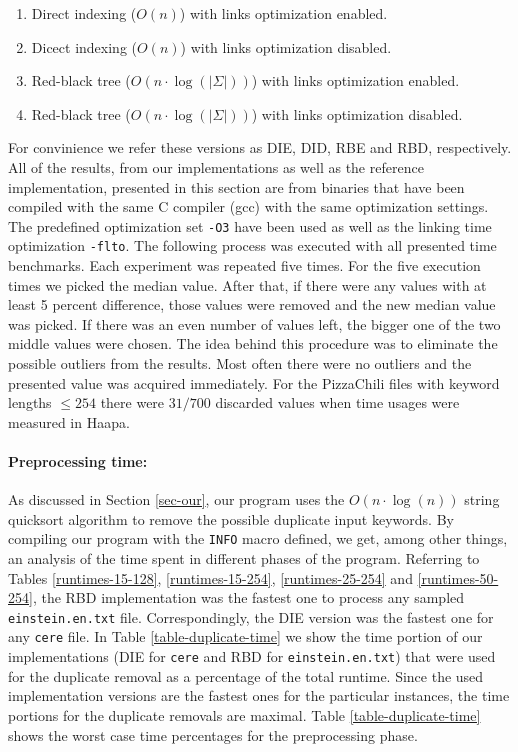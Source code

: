 \documentclass[english,twoside,censored,csm,algorithms-track-2020]{HYthesisML}
\theoremstyle{plain}
\theoremstyle{definition}
\numberwithin{testexample}{chapter}
\begin{document}


\begin{enumerate}
\item Direct indexing ($O(n)$) with links optimization enabled.
\item Dicect indexing ($O(n)$) with links optimization disabled.
\item Red-black tree ($O(n\cdot\log(|\Sigma|))$) with links optimization enabled.
\item Red-black tree ($O(n\cdot\log(|\Sigma|))$) with links optimization disabled.
\end{enumerate}

For convinience we refer these versions as DIE, DID, RBE and RBD, respectively. All of the results,
from our implementations as well as the reference implementation,
presented in this section are from binaries that have been compiled with the same C
compiler (gcc) with the same optimization settings. The predefined optimization set \texttt{-O3} have
been used as well as the linking time optimization \texttt{-flto}. The following process was executed
with all presented time benchmarks. Each experiment was repeated five times. For
the five execution times we picked the median value. After that, if there were any values with 
at least 5 percent difference, those values were removed and the new median value was picked.
If there was an even number of values left, the bigger one of the two middle values were chosen.
The idea behind this procedure was to eliminate the possible outliers from the results. Most often
there were no outliers and the presented value was acquired immediately. For the PizzaChili files
with keyword lengths $\leq 254$ there were $31/700$ discarded values when time usages were
measured in Haapa.

\paragraph{Preprocessing time:}
As discussed in Section \ref{sec-our}, our program uses the $O(n\cdot\log(n))$ string quicksort
algorithm to remove the possible duplicate input keywords. By compiling our program with the
\texttt{INFO} macro defined, we get, among other things, an analysis of the time spent in different phases
of the program. Referring to Tables \ref{runtimes-15-128}, \ref{runtimes-15-254},
\ref{runtimes-25-254} and \ref{runtimes-50-254}, the RBD implementation was the fastest one
to process any sampled \texttt{einstein.en.txt}
file. Correspondingly, the DIE version was the fastest one for any \texttt{cere} file. In Table
\ref{table-duplicate-time}
we show the time portion of our implementations (DIE for \texttt{cere} and RBD for
\texttt{einstein.en.txt}) that were
used for the duplicate removal as a percentage of the total runtime. Since the used  implementation
versions are the fastest ones for the particular instances, the time portions for the duplicate
removals are maximal. Table \ref{table-duplicate-time} shows the worst case time percentages
for the preprocessing phase.
\end{document}
